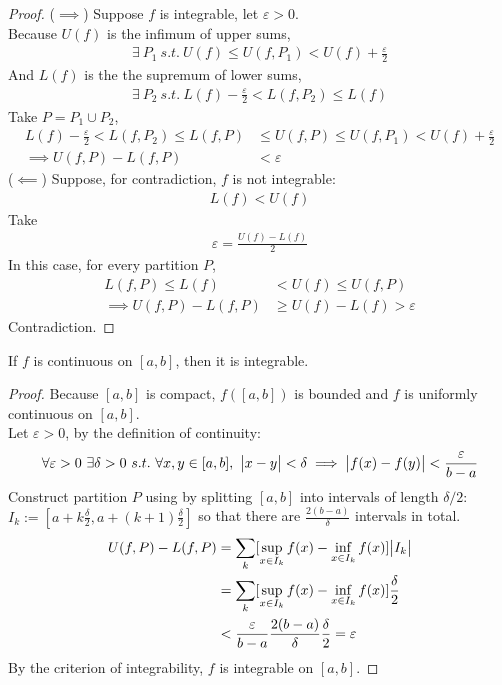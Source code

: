 \documentclass[11pt]{article}
\begin{document}
	\begin{proof}
		($\implies$) Suppose $f$ is integrable, let $\varepsilon > 0$. \\
		Because $U(f)$ is the infimum of upper sums,
		\begin{align}
			\exists\ P_1\ s.t.\ U(f) \leq U(f, P_1) < U(f) + \frac{\varepsilon}{2}
		\end{align}
		And $L(f)$ is the the supremum of lower sums,
		\begin{align}
			\exists\ P_2\ s.t.\ L(f) - \frac{\varepsilon}{2} < L(f, P_2) \leq L(f)
		\end{align}
		Take $P = P_1 \cup P_2$,
		\begin{align}
			L(f) - \frac{\varepsilon}{2} < L(f, P_2) \leq L(f, P) &\leq U(f, P) \leq U(f, P_1) < U(f) + \frac{\varepsilon}{2} \\
			\implies U(f, P) - L(f, P) &< \varepsilon
		\end{align}
		($\impliedby$) Suppose, for contradiction, $f$ is not integrable:
		\begin{align}
			L(f) < U(f)
		\end{align}
		Take
		\begin{align}
			\varepsilon = \frac{U(f) - L(f)}{2}
		\end{align}
		In this case, for every partition $P$,
		\begin{align}
			L(f, P) \leq L(f) &< U(f) \leq U(f, P) \\
			\implies U(f, P) - L(f, P) &\geq U(f) - L(f) > \varepsilon
		\end{align}
		Contradiction.
	\end{proof}
	
	\begin{theorem}
		If $f$ is continuous on $[a, b]$, then it is integrable.
	\end{theorem}
	
	\begin{proof}
		Because $[a, b]$ is compact, $f([a, b])$ is bounded and $f$ is uniformly continuous on $[a, b]$. \\
		Let $\varepsilon > 0$, by the definition of continuity:
		\begin{align}
			\forall \varepsilon > 0\ \exists \delta > 0\ s.t.\ \forall x, y \in [a, b],\ \abs{x - y} < \delta \implies \abs{f(x) - f(y)} < \frac{\varepsilon}{b - a}
		\end{align}
		Construct partition $P$ using by splitting $[a, b]$ into intervals of length $\delta / 2$: $I_k := [a + k \frac{\delta}{2}, a + (k + 1) \frac{\delta}{2}]$ so that there are $\frac{2(b-a)}{\delta}$ intervals in total.
		\begin{align}
			U(f, P) - L(f, P) &= \sum_k [\sup_{x \in I_k} f(x) - \inf_{x \in I_k} f(x)] \big \vert {I_k} \big \vert \\
			&= \sum_k [\sup_{x \in I_k} f(x) - \inf_{x \in I_k} f(x)] \frac{\delta}{2} \\
			&< \frac{\varepsilon}{b - a} \frac{2 (b - a)}{\delta} \frac{\delta}{2} = \varepsilon
		\end{align}
		By the criterion of integrability, $f$ is integrable on $[a, b]$.
	\end{proof}
	
\end{document}
